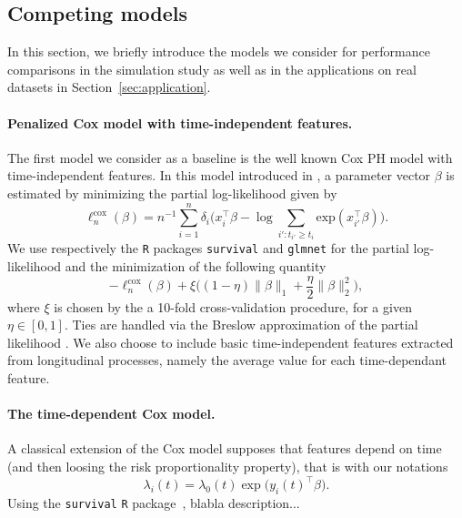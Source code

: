 \documentclass[11pt]{article}
\newcommand{\norm}[1]{\|#1\|}
\begin{document}
\subsection{Competing models}
\label{sec:competing models}

In this section, we briefly introduce the models we consider for performance comparisons in the simulation study as well as in the applications on real datasets in Section~\ref{sec:application}.

\paragraph*{Penalized Cox model with time-independent features.}

The first model we consider as a baseline is the well known Cox PH model with time-independent features.
In this model introduced in \citet{Cox1972JRSS}, a parameter vector $\beta$ is estimated by minimizing the partial log-likelihood given by
\begin{equation*}
  \ell_n^{\text{cox}}(\beta) = n^{-1} \sum_{i=1}^n \delta_i \big( x_i^\top \beta - \log \sum_{i' : t_{i'} \geq t_i} \text{exp}(x_{i'}^\top \beta) \big).
\end{equation*}
We use respectively the \texttt{R} packages \texttt{survival} and \texttt{glmnet} \citep{simon2011regularization} for the partial log-likelihood and the minimization of the following quantity
\begin{equation*}
  - \ell_n^{\text{cox}}(\beta) + \xi \big( (1-\eta)\norm{\beta}_1 + \frac{\eta}{2} \norm{\beta}_2^2 \big),
\end{equation*}
where $\xi$ is chosen by the a 10-fold cross-validation procedure, for a given $\eta \in [0, 1]$. Ties are handled via the Breslow approximation of the partial likelihood \citep{breslow1972contribution}. We also choose to include basic time-independent features extracted from longitudinal processes, namely the average value for each time-dependant feature.

\paragraph*{The time-dependent Cox model.}

A classical extension of the Cox model supposes that features depend on time~\citep{sueyoshi1992semiparametric} (and then loosing the risk proportionality property), that is with our notations
\[\lambda_i(t) = \lambda_0(t) \exp\big(y_i(t)^\top \beta \big). \]
Using the \texttt{survival} \texttt{R} package~\citep{zhang2018time}, blabla description...
\end{document}

